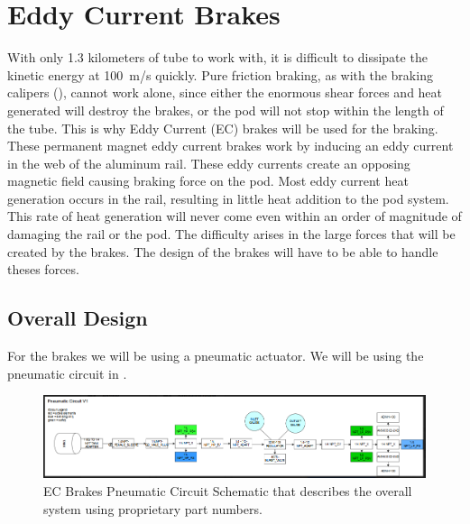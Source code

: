 \documentclass[main.tex]{subfiles}
\begin{document}
    \chapter{Eddy Current Brakes}
    \label{ch:eddy-current-brakes}
    With only 1.3 kilometers of tube to work with, it is difficult to dissipate the kinetic energy at \SI{100}{m/s} quickly. Pure friction braking, as with the braking calipers (), cannot work alone, since either the enormous shear forces and heat generated will destroy the brakes, or the pod will not stop within the length of the tube. This is why Eddy Current (EC) brakes will be used for the braking. These permanent magnet eddy current brakes work by inducing an eddy current in the web of the aluminum rail. These eddy currents create an opposing magnetic field causing braking force on the pod. Most eddy current heat generation occurs in the rail, resulting in little heat addition to the pod system. This rate of heat generation will never come even within an order of magnitude of damaging the rail or the pod. The difficulty arises in the large forces that will be created by the brakes. The design of the brakes will have to be able to handle theses forces.

    \section{Overall Design}
    For the brakes we will be using a pneumatic actuator. We will be using the pneumatic circuit in . \\
    \begin{figure}[H]
        \centering
        \includegraphics[width=\linewidth]{images/EC_Pnuematic_Circuit.png}
        \caption{EC Brakes Pneumatic Circuit Schematic that describes the overall system using proprietary part numbers.}
        \label{fig:pneumatic-circuit}
    \end{figure}
\end{document}
